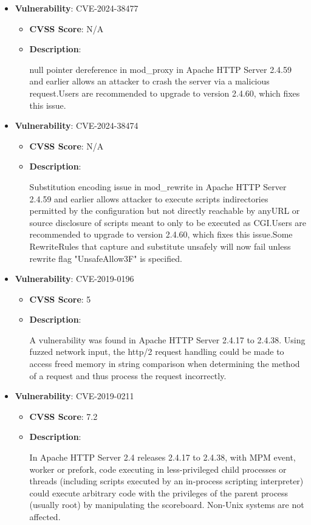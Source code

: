 \documentclass{article}
\begin{document}
\begin{itemize}
        \item \textbf{Vulnerability}: CVE-2024-38477
        \begin{itemize}
            \item \textbf{CVSS Score}:  N/A 
            \item \textbf{Description}:
            \parbox[t]{0.9\linewidth}{
                \ttfamily null pointer dereference in mod\_proxy in Apache HTTP Server 2.4.59 and earlier allows an attacker to crash the server via a malicious request.Users are recommended to upgrade to version 2.4.60, which fixes this issue.
            }
        \end{itemize}
    
        \item \textbf{Vulnerability}: CVE-2024-38474
        \begin{itemize}
            \item \textbf{CVSS Score}:  N/A 
            \item \textbf{Description}:
            \parbox[t]{0.9\linewidth}{
                \ttfamily Substitution encoding issue in mod\_rewrite in Apache HTTP Server 2.4.59 and earlier allows attacker to execute scripts indirectories permitted by the configuration but not directly reachable by anyURL or source disclosure of scripts meant to only to be executed as CGI.Users are recommended to upgrade to version 2.4.60, which fixes this issue.Some RewriteRules that capture and substitute unsafely will now fail unless rewrite flag "UnsafeAllow3F" is specified.
            }
        \end{itemize}
    
        \item \textbf{Vulnerability}: CVE-2019-0196
        \begin{itemize}
            \item \textbf{CVSS Score}:  5 
            \item \textbf{Description}:
            \parbox[t]{0.9\linewidth}{
                \ttfamily A vulnerability was found in Apache HTTP Server 2.4.17 to 2.4.38. Using fuzzed network input, the http/2 request handling could be made to access freed memory in string comparison when determining the method of a request and thus process the request incorrectly.
            }
        \end{itemize}
    
        \item \textbf{Vulnerability}: CVE-2019-0211
        \begin{itemize}
            \item \textbf{CVSS Score}:  7.2 
            \item \textbf{Description}:
            \parbox[t]{0.9\linewidth}{
                \ttfamily In Apache HTTP Server 2.4 releases 2.4.17 to 2.4.38, with MPM event, worker or prefork, code executing in less-privileged child processes or threads (including scripts executed by an in-process scripting interpreter) could execute arbitrary code with the privileges of the parent process (usually root) by manipulating the scoreboard. Non-Unix systems are not affected.
            }
        \end{itemize}
    

\end{itemize}
\end{document}
